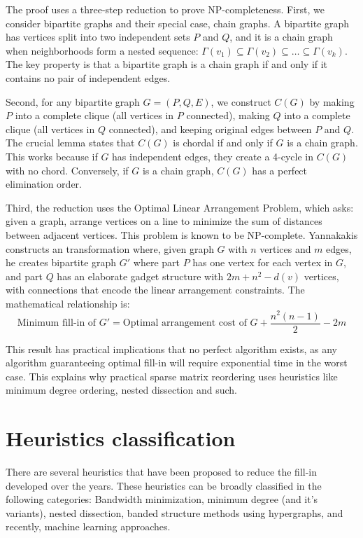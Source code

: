 The proof uses a three-step reduction to prove NP-completeness. First, we consider bipartite graphs and their special case, chain graphs. A bipartite graph has vertices split into two independent sets $P$ and $Q$, and it is a chain graph when neighborhoods form a nested sequence: $\Gamma(v_1) \subseteq \Gamma(v_2) \subseteq \ldots \subseteq \Gamma(v_k)$. The key property is that a bipartite graph is a chain graph if and only if it contains no pair of independent edges.

Second, for any bipartite graph $G = (P, Q, E)$, we construct $C(G)$ by making $P$ into a complete clique (all vertices in $P$ connected), making $Q$ into a complete clique (all vertices in $Q$ connected), and keeping original edges between $P$ and $Q$. The crucial lemma states that $C(G)$ is chordal if and only if $G$ is a chain graph. This works because if $G$ has independent edges, they create a 4-cycle in $C(G)$ with no chord. Conversely, if $G$ is a chain graph, $C(G)$ has a perfect elimination order.

Third, the reduction uses the Optimal Linear Arrangement Problem, which asks: given a graph, arrange vertices on a line to minimize the sum of distances between adjacent vertices. This problem is known to be NP-complete. Yannakakis constructs an transformation where, given graph $G$ with $n$ vertices and $m$ edges, he creates bipartite graph $G'$ where part $P$ has one vertex for each vertex in $G$, and part $Q$ has an elaborate gadget structure with $2m + n^2 - d(v)$ vertices, with connections that encode the linear arrangement constraints. The mathematical relationship is:
\begin{equation}
\text{Minimum fill-in of } G' = \text{Optimal arrangement cost of } G + \frac{n^2(n-1)}{2} - 2m
\end{equation}

This result has practical implications that no perfect algorithm exists, as any algorithm guaranteeing optimal fill-in will require exponential time in the worst case. This explains why practical sparse matrix reordering uses heuristics like minimum degree ordering, nested dissection and such.

\section{Heuristics classification}
\label{sec:heuristics}

There are several heuristics that have been proposed to reduce the fill-in developed over the years. These heuristics can be broadly classified in the following categories: Bandwidth minimization, minimum degree (and it's variants), nested dissection, banded structure methods using hypergraphs, and recently, machine learning approaches. 

